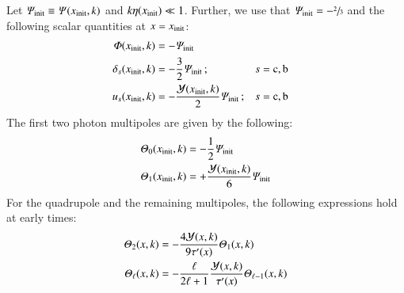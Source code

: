 Let $\varPsi_\mathrm{init}\equiv\varPsi(x_\mathrm{init}, k)$ and $k\eta(x_\mathrm{init}) \ll 1$. Further, we use that $\varPsi_\mathrm{init}=-\sfrac{2}{3}$ and the following scalar quantities at $x=x_\mathrm{init}$:
\begin{subequations}\label{app:pert:eq:initial_conditions}
\begin{align}
    \varPhi(x_\mathrm{init}, k)     &= -\varPsi_\mathrm{init}                                 \label{app:pert:eq:init_Phi}\\
    \delta_s(x_\mathrm{init}, k) &= -\frac{3}{2} \varPsi_\mathrm{init}                   \,; &&s=\mathrm{c,b} \label{app:pert:eq:init_delta}\\
    u_s(x_\mathrm{init}, k)      &= -\frac{\mathcal{Y}(x_\mathrm{init}, k)}{2} \varPsi_\mathrm{init}\,; &&s=\mathrm{c,b} \label{app:pert:eq:init_u}
\end{align}
\end{subequations}
The first two photon multipoles are given by the following:
\begin{subequations}\label{app:pert:eq:initial_conditions_Theta01}
\begin{align}
    \varTheta_0(x_\mathrm{init}, k) &= -\frac{1}{2}\varPsi_\mathrm{init}        \label{app:pert:eq:init_Theta0}\\
    \varTheta_1(x_\mathrm{init}, k) &= +\frac{\mathcal{Y}(x_\mathrm{init}, k)}{6}\varPsi_\mathrm{init}     \label{app:pert:eq:init_Theta1}
\end{align}
\end{subequations}
For the quadrupole and the remaining multipoles, the following expressions hold at early times:
\begin{subequations}\label{app:pert:eq:initial_conditions_Theta2ell}
\begin{align}
    \varTheta_2(x, k) &= -\frac{4\mathcal{Y}(x, k)}{9\tau'(x)}\varTheta_{1}(x, k)\label{app:pert:eq:init_Theta2} \\
    \varTheta_\ell(x, k) &= -\frac{\ell}{2\ell+1} \frac{\mathcal{Y}(x, k)}{\tau'(x)} \varTheta_{\ell-1}(x, k) \label{app:pert:eq:init_Thetaell}
\end{align}
\end{subequations}












